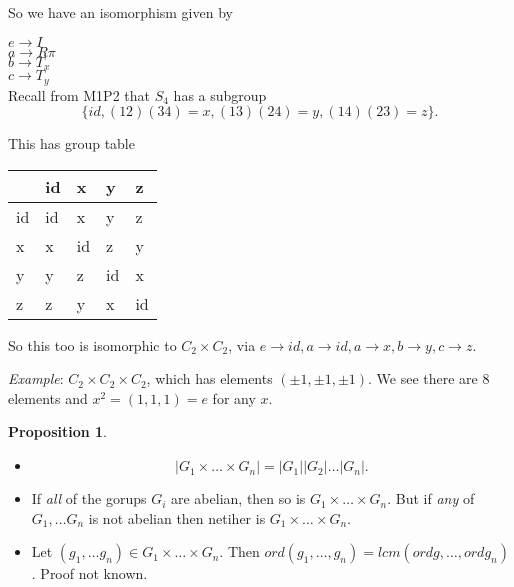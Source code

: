 \documentclass{article}
\theoremstyle{definition}
\newtheorem{proposition}[theorem]{Proposition}
\begin{document}
So we have an isomorphism given by

$e \rightarrow I$\\
$a \rightarrow R\pi$\\
$b \rightarrow T_x$\\
$c \rightarrow T_y$\\

Recall from M1P2 that $S_4$ has a subgroup $$\{id,  (12)(34)=x, (13)(24)=y, (14)(23)=z\}.$$

This has group table 
\begin{table}[]
\centering
\begin{tabular}{l|llll}
   & id & x  & y  & z \\
   \hline
id & id & x  & y  & z \\
x  & x  & id & z  & y \\
y  & y  & z  & id & x \\
z  & z  & y  & x  & id 
\end{tabular}
\end{table}

So this too is isomorphic to $C_2 \times C_2$, via $e \rightarrow id, a \rightarrow id, a \rightarrow x, b \rightarrow y, c \rightarrow z$.

\emph{Example}: $C_2 \times C_2 \times C_2$, which has elements $(\pm 1, \pm 1, \pm 1)$. We see there are 8 elements and $x^2=(1,1,1)=e$ for any $x$.

\begin{proposition}
\begin{itemize}
\item $$|G_1 \times \ldots \times G_n| =|G_1||G_2|\ldots|G_n|.$$
\item If \emph{all} of the gorups $G_i$ are abelian, then so is $G_1 \times \ldots \times G_n$. But if \emph{any} of $G_1, \ldots G_n$ is not abelian then netiher is $G_1 \times \ldots \times G_n$.
\item Let $(g_1, \ldots g_n) \in G_1 \times \ldots \times G_n$. Then $ord (g_1, \ldots , g_n) = lcm (ord g, \ldots , ord g_n)$.
Proof not known.
\end{itemize}
\end{proposition}
\end{document}
